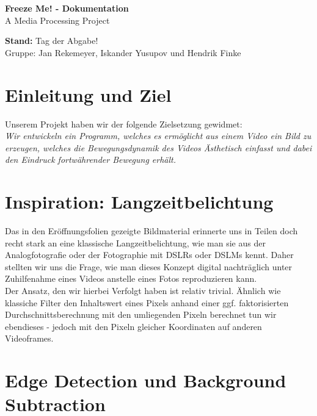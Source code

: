 \documentclass[12pt]{scrartcl}
\begin{document}
\hspace{-0.4cm}\huge \textbf{Freeze Me! - Dokumentation}\vspace{3pt}\\\Large A Media Processing Project \vspace{14pt}\large 

\noindent
\textbf{Stand:} Tag der Abgabe! \\ 

\vspace{3pt} \normalsize Gruppe: 
Jan Rekemeyer, Iskander Yusupov und Hendrik Finke

\section{Einleitung und Ziel} %
Unserem Projekt haben wir der folgende Zielsetzung gewidmet: \\
\textit{Wir entwickeln ein Programm, welches es erm\"oglicht aus einem Video ein Bild zu erzeugen, welches die Bewegungsdynamik des Videos \"Asthetisch einfasst und dabei den Eindruck fortw\"ahrender Bewegung erh\"alt.}

\section{Inspiration: Langzeitbelichtung} %
Das in den Er\"offnungsfolien gezeigte Bildmaterial erinnerte uns in Teilen doch recht stark an eine klassische Langzeitbelichtung, wie man sie aus der Analogfotografie oder der Fotographie mit DSLRs oder DSLMs kennt. Daher stellten wir uns die Frage, wie man dieses Konzept digital nachtr\"aglich unter Zuhilfenahme eines Videos anstelle eines Fotos reproduzieren kann. \\
Der Ansatz, den wir hierbei Verfolgt haben ist relativ trivial. \"Ahnlich wie klassiche Filter den Inhaltswert eines Pixels anhand einer ggf. faktorisierten Durchschnittsberechnung mit den umliegenden Pixeln berechnet tun wir ebendieses - jedoch mit den Pixeln gleicher Koordinaten auf anderen Videoframes. 

\section{Edge Detection und Background Subtraction}
\end{document}
